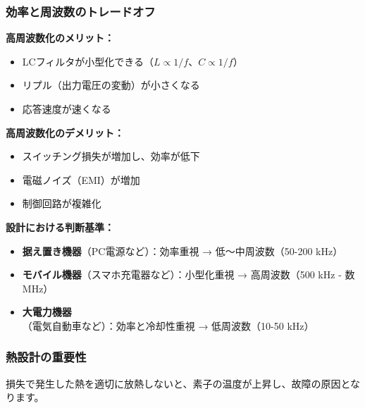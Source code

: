 \subsubsection{効率と周波数のトレードオフ}

\begin{screen}
\textbf{高周波数化のメリット：}

\begin{itemize}
\item LCフィルタが小型化できる（$L \propto 1/f$、$C \propto 1/f$）
\item リプル（出力電圧の変動）が小さくなる
\item 応答速度が速くなる
\end{itemize}

\textbf{高周波数化のデメリット：}

\begin{itemize}
\item スイッチング損失が増加し、効率が低下
\item 電磁ノイズ（EMI）が増加
\item 制御回路が複雑化
\end{itemize}

\textbf{設計における判断基準：}

\begin{itemize}
\item \textbf{据え置き機器}（PC電源など）：効率重視 → 低〜中周波数（50-200 kHz）
\item \textbf{モバイル機器}（スマホ充電器など）：小型化重視 → 高周波数（500 kHz - 数MHz）
\item \textbf{大電力機器}（電気自動車など）：効率と冷却性重視 → 低周波数（10-50 kHz）
\end{itemize}
\end{screen}

\subsubsection{熱設計の重要性}

損失で発生した熱を適切に放熱しないと、素子の温度が上昇し、故障の原因となります。


